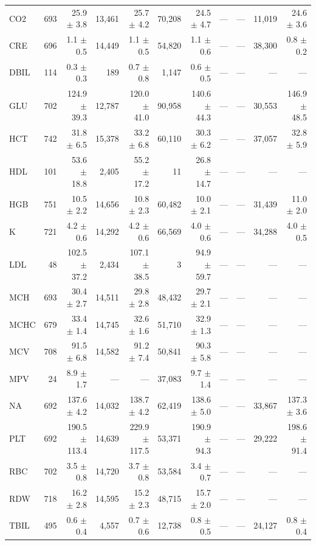 \begin{table}[ht]
\begin{tabular}{lrrrrrrrrrr}
CO2 & 693 & 25.9 $\pm$ 3.8 & 13,461 & 25.7 $\pm$ 4.2 & 70,208 & 24.5 $\pm$ 4.7 & --- & --- & 11,019 & 24.6 $\pm$ 3.6 \\
CRE & 696 & 1.1 $\pm$ 0.5 & 14,449 & 1.1 $\pm$ 0.5 & 54,820 & 1.1 $\pm$ 0.6 & --- & --- & 38,300 & 0.8 $\pm$ 0.2 \\
DBIL & 114 & 0.3 $\pm$ 0.3 & 189 & 0.7 $\pm$ 0.8 & 1,147 & 0.6 $\pm$ 0.5 & --- & --- & --- & --- \\
GLU & 702 & 124.9 $\pm$ 39.3 & 12,787 & 120.0 $\pm$ 41.0 & 90,958 & 140.6 $\pm$ 44.3 & --- & --- & 30,553 & 146.9 $\pm$ 48.5 \\
HCT & 742 & 31.8 $\pm$ 6.5 & 15,378 & 33.2 $\pm$ 6.8 & 60,110 & 30.3 $\pm$ 6.2 & --- & --- & 37,057 & 32.8 $\pm$ 5.9 \\
HDL & 101 & 53.6 $\pm$ 18.8 & 2,405 & 55.2 $\pm$ 17.2 & 11 & 26.8 $\pm$ 14.7 & --- & --- & --- & --- \\
HGB & 751 & 10.5 $\pm$ 2.2 & 14,656 & 10.8 $\pm$ 2.3 & 60,482 & 10.0 $\pm$ 2.1 & --- & --- & 31,439 & 11.0 $\pm$ 2.0 \\
K & 721 & 4.2 $\pm$ 0.6 & 14,292 & 4.2 $\pm$ 0.6 & 66,569 & 4.0 $\pm$ 0.6 & --- & --- & 34,288 & 4.0 $\pm$ 0.5 \\
LDL & 48 & 102.5 $\pm$ 37.2 & 2,434 & 107.1 $\pm$ 38.5 & 3 & 94.9 $\pm$ 59.7 & --- & --- & --- & --- \\
MCH & 693 & 30.4 $\pm$ 2.7 & 14,511 & 29.8 $\pm$ 2.8 & 48,432 & 29.7 $\pm$ 2.1 & --- & --- & --- & --- \\
MCHC & 679 & 33.4 $\pm$ 1.4 & 14,745 & 32.6 $\pm$ 1.6 & 51,710 & 32.9 $\pm$ 1.3 & --- & --- & --- & --- \\
MCV & 708 & 91.5 $\pm$ 6.8 & 14,582 & 91.2 $\pm$ 7.4 & 50,841 & 90.3 $\pm$ 5.8 & --- & --- & --- & --- \\
MPV & 24 & 8.9 $\pm$ 1.7 & --- & --- & 37,083 & 9.7 $\pm$ 1.4 & --- & --- & --- & --- \\
NA & 692 & 137.6 $\pm$ 4.2 & 14,032 & 138.7 $\pm$ 4.2 & 62,419 & 138.6 $\pm$ 5.0 & --- & --- & 33,867 & 137.3 $\pm$ 3.6 \\
PLT & 692 & 190.5 $\pm$ 113.4 & 14,639 & 229.9 $\pm$ 117.5 & 53,371 & 190.9 $\pm$ 94.3 & --- & --- & 29,222 & 198.6 $\pm$ 91.4 \\
RBC & 702 & 3.5 $\pm$ 0.8 & 14,720 & 3.7 $\pm$ 0.8 & 53,584 & 3.4 $\pm$ 0.7 & --- & --- & --- & --- \\
RDW & 718 & 16.2 $\pm$ 2.8 & 14,595 & 15.2 $\pm$ 2.3 & 48,715 & 15.7 $\pm$ 2.0 & --- & --- & --- & --- \\
TBIL & 495 & 0.6 $\pm$ 0.4 & 4,557 & 0.7 $\pm$ 0.6 & 12,738 & 0.8 $\pm$ 0.5 & --- & --- & 24,127 & 0.8 $\pm$ 0.4 \\

\end{tabular}
\end{table}
